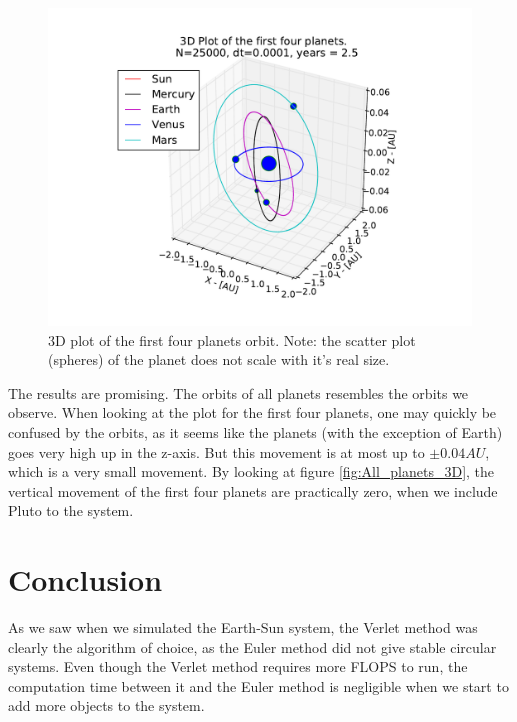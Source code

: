 \documentclass[12pt]{article}
\begin{document}

\begin{figure}[!h]
\centering
\includegraphics[width=\linewidth]{Plots/First_planets_3D_plot.pdf}
\caption{3D plot of the first four planets orbit. Note: the scatter plot (spheres) of the planet does not scale with it's real size.}
\label{fig:First4_planets_3D}
\end{figure}

The results are promising. The orbits of all planets resembles the orbits we observe. When looking at the plot for the first four planets, one may quickly be confused by the orbits, as it seems like the planets (with the exception of Earth) goes very high up in the z-axis. But this movement is at most up to $\pm 0.04AU$, which is a very small movement. By looking at figure \ref{fig:All_planets_3D}, the vertical movement of the first four planets are practically zero, when we include Pluto to the system.

\FloatBarrier

\section*{Conclusion}
As we saw when we simulated the Earth-Sun system, the Verlet method was clearly the algorithm of choice, as the Euler method did not give stable circular systems. Even though the Verlet method requires more FLOPS to run, the computation time between it and the Euler method is negligible when we start to add more objects to the system.
\end{document}
